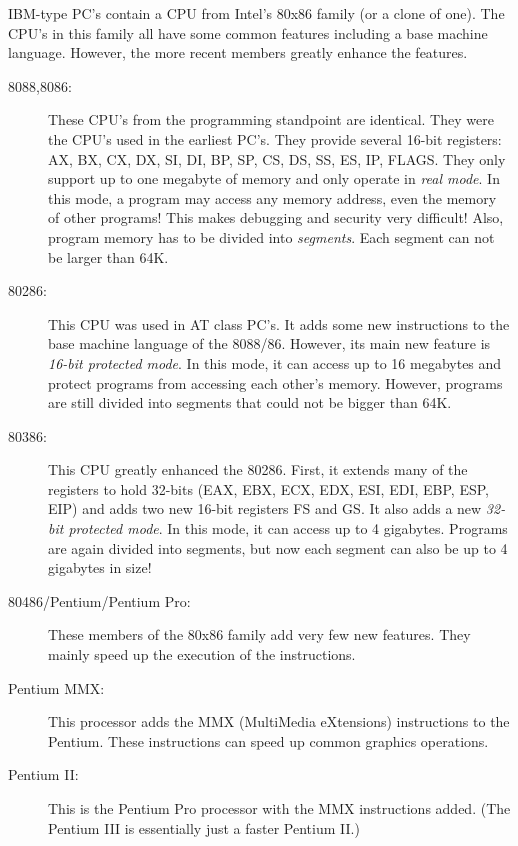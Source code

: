 IBM-type PC's contain a CPU from Intel's 80x86 family (or a clone of one).
The CPU's in this family all have some common features including a base
machine language. However, the more recent members greatly enhance the
features.
\begin{description}

\item[8088,8086:] These CPU's from the programming standpoint are
identical. They were the CPU's used in the earliest PC's. They provide
several 16-bit registers: AX, BX, CX, DX, SI, DI, BP, SP, CS, DS, SS,
ES, IP, FLAGS. They only support up to one megabyte of memory and only
operate in \emph{real mode}.  In this mode, a program may access any
memory address, even the memory of other programs! This makes
debugging and security very difficult! Also, program memory has to be
divided into \emph{segments}. Each segment can not be larger than
64K.

\item[80286:] This CPU was used in AT class PC's. It adds some new
instructions to the base machine language of the 8088/86.  However,
its main new feature is \emph{16-bit protected mode}.  In this mode,
it can access up to 16 megabytes and protect programs from accessing
each other's memory. However, programs are still divided into
segments that could not be bigger than 64K.

\item[80386:] This CPU greatly enhanced the 80286. First, it extends many
of the registers to hold 32-bits (EAX, EBX, ECX, EDX, ESI, EDI, EBP, ESP,
EIP) and adds two new 16-bit registers FS and GS. It also adds a new
\emph{32-bit protected mode}. In this mode, it can access up to 4 gigabytes.
Programs are again divided into segments, but now each segment can also be
up to 4 gigabytes in size!

\item[80486/Pentium/Pentium Pro:] These members of the 80x86 family add
very few new features. They mainly speed up the execution of the
instructions.

\item[Pentium MMX:] This processor adds the MMX (MultiMedia eXtensions)
instructions to the Pentium. These instructions can speed up common graphics
operations.

\item[Pentium II:] This is the Pentium Pro processor with the MMX instructions
added. (The Pentium III is essentially just a faster Pentium II.)

\end{description}

